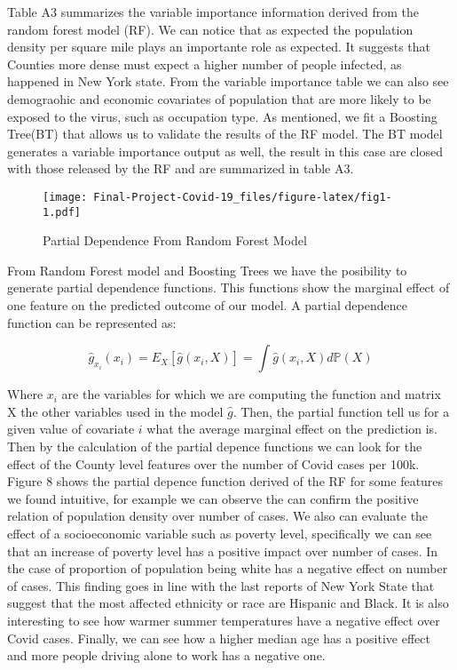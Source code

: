 \documentclass[
]{article}
\begin{document}
Table A3 summarizes the variable importance information derived from the
random forest model (RF). We can notice that as expected the population
density per square mile plays an importante role as expected. It
suggests that Counties more dense must expect a higher number of people
infected, as happened in New York state. From the variable importance
table we can also see demograohic and economic covariates of population
that are more likely to be exposed to the virus, such as occupation
type. As mentioned, we fit a Boosting Tree(BT) that allows us to
validate the results of the RF model. The BT model generates a variable
importance output as well, the result in this case are closed with those
released by the RF and are summarized in table A3.

\begin{figure}
\centering
\texttt{[image: Final-Project-Covid-19\_files/figure-latex/fig1-1.pdf]}
\caption{Partial Dependence From Random Forest Model}
\end{figure}

From Random Forest model and Boosting Trees we have the posibility to
generate partial dependence functions. This functions show the marginal
effect of one feature on the predicted outcome of our model. A partial
dependence function can be represented as:

\[\hat{g}_{x_i}(x_i)=E_{X}\left[\hat{g}(x_i,X)\right]=\int\hat{g}(x_i,X)d\mathbb{P}(X)\]

Where \(x_i\) are the variables for which we are computing the function
and matrix X the other variables used in the model \(\hat{g}\). Then,
the partial function tell us for a given value of covariate \(i\) what
the average marginal effect on the prediction is. Then by the
calculation of the partial depence functions we can look for the effect
of the County level features over the number of Covid cases per 100k.
Figure 8 shows the partial depence function derived of the RF for some
features we found intuitive, for example we can observe the can confirm
the positive relation of population density over number of cases. We
also can evaluate the effect of a socioeconomic variable such as poverty
level, specifically we can see that an increase of poverty level has a
positive impact over number of cases. In the case of proportion of
population being white has a negative effect on number of cases. This
finding goes in line with the last reports of New York State that
suggest that the most affected ethnicity or race are Hispanic and Black.
It is also interesting to see how warmer summer temperatures have a
negative effect over Covid cases. Finally, we can see how a higher
median age has a positive effect and more people driving alone to work
has a negative one.
\end{document}
